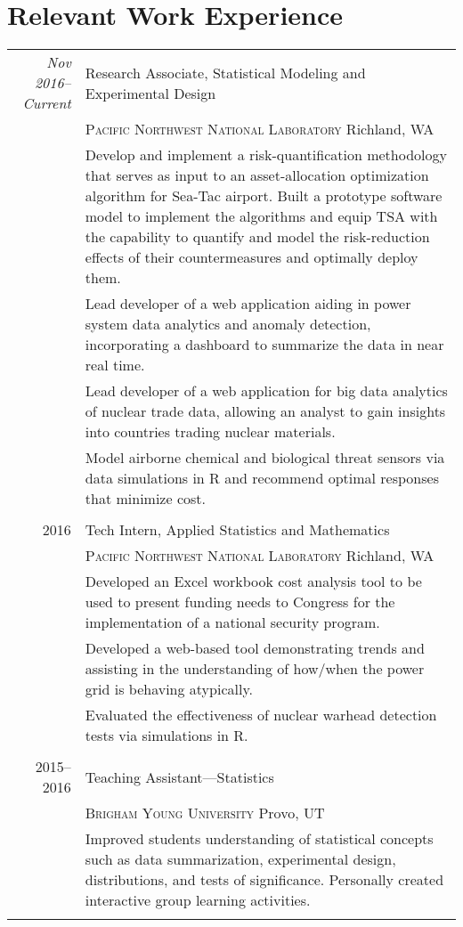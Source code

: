 \documentclass[a4paper,12pt]{article}
\begin{document}
\section{Relevant Work Experience}
\begin{tabular}{r|p{11cm}}
  \emph{Nov 2016--Current} & Research Associate, Statistical Modeling and Experimental Design \\
  & \textsc{Pacific Northwest National Laboratory} Richland, WA \\
  & \footnotesize{Develop and implement a risk-quantification methodology that serves as input to an asset-allocation optimization algorithm for Sea-Tac airport. Built a prototype software model to implement the algorithms and equip TSA with the capability to quantify and model the risk-reduction effects of their countermeasures and optimally deploy them.} \\
  & \footnotesize{Lead developer of a web application aiding in power system data analytics and anomaly detection, incorporating a dashboard to summarize the data in near real time.} \\
  & \footnotesize{Lead developer of a web application for big data analytics of nuclear trade data, allowing an analyst to gain insights into countries trading nuclear materials.} \\
  & \footnotesize{Model airborne chemical and biological threat sensors via data simulations in R and recommend optimal responses that minimize cost.} \\ \multicolumn{2}{c}{} \\
  
  \textsc{2016} & Tech Intern, Applied Statistics and Mathematics \\
  & \textsc{Pacific Northwest National Laboratory} Richland, WA \\
  & \footnotesize{Developed an Excel workbook cost analysis tool to be used to present funding needs to Congress for the implementation of a national security program.} \\
  & \footnotesize{Developed a web-based tool demonstrating trends and assisting in the understanding of how/when the power grid is behaving atypically.} \\
  & \footnotesize{Evaluated the effectiveness of nuclear warhead detection tests via simulations in R.} \\ \multicolumn{2}{c}{} \\
  
  \textsc{2015--2016} & Teaching Assistant---Statistics \\
  & \textsc{Brigham Young University} Provo, UT \\
  & \footnotesize{Improved students understanding of statistical concepts such as data summarization, experimental design, distributions, and tests of significance. Personally created interactive group learning activities.} \\ \multicolumn{2}{c}{} \\
\end{tabular}
\end{document}
